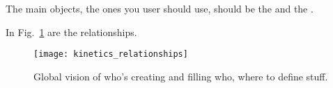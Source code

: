 The main objects, the ones you user should use, should be the
 and the .

In Fig.~\ref{kinpf} are the relationships.
\begin{figure}
\centering
\texttt{[image: kinetics\_relationships]}
\caption{\label{kinpf}Global vision of who's creating and filling
who, where to define stuff.}
\end{figure}

